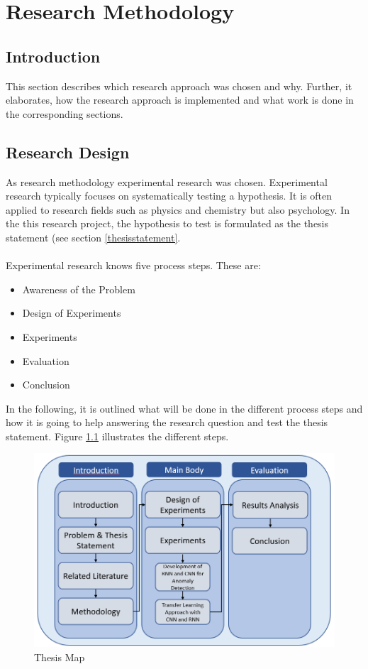 
\chapter{Research Methodology} %

\section{Introduction}
This section describes which research approach was chosen and why. Further, it elaborates, how the research approach is implemented and what work is done in the corresponding sections. 

\section{Research Design}
As research methodology experimental research was chosen. Experimental research typically focuses on systematically testing a hypothesis. It is often applied to research fields such as physics and chemistry but also psychology. In the this research project, the hypothesis to test is formulated as the thesis statement (see section \ref{thesisstatement}.\\
\\
Experimental research knows five process steps. These are:

\begin{itemize}
	\item Awareness of the Problem
	\item Design of Experiments
	\item Experiments
	\item Evaluation
	\item Conclusion
\end{itemize}

In the following, it is outlined what will be done in the different process steps and how it is going to help answering the research question and test the thesis statement. Figure \ref{Thesis Map} illustrates the different steps.

\begin{figure}[h]
	\centering
	\includegraphics[scale=0.5]{Figures/Thesis Map}
	\decoRule
	\caption[Thesis Map]{Thesis Map \parencite{own}}
	\label{Thesis Map}
\end{figure}

